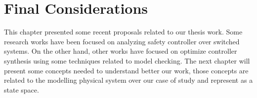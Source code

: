 \section{Final Considerations}
    This chapter presented some recent proposals related to our thesis work. Some research works have been focused on analyzing safety controller over switched systems. On the other hand, other works have focused on optimize controller synthesis using some techniques related to model checking. 
    The next chapter will present some concepts needed to understand better our work, those concepts are related to the modelling physical system over our case of study and represent as a state space.


















